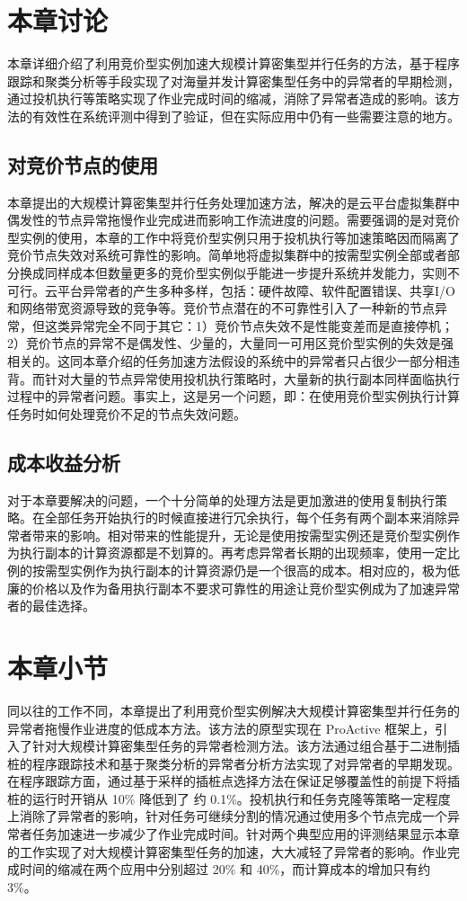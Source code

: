 \section{本章讨论}
本章详细介绍了利用竞价型实例加速大规模计算密集型并行任务的方法，基于程序跟踪和聚类分析等手段实现了对海量并发计算密集型任务中的异常者的早期检测，通过投机执行等策略实现了作业完成时间的缩减，消除了异常者造成的影响。该方法的有效性在系统评测中得到了验证，但在实际应用中仍有一些需要注意的地方。

\subsection{对竞价节点的使用}
本章提出的大规模计算密集型并行任务处理加速方法，解决的是云平台虚拟集群中偶发性的节点异常拖慢作业完成进而影响工作流进度的问题。需要强调的是对竞价型实例的使用，本章的工作中将竞价型实例只用于投机执行等加速策略因而隔离了竞价节点失效对系统可靠性的影响。简单地将虚拟集群中的按需型实例全部或者部分换成同样成本但数量更多的竞价型实例似乎能进一步提升系统并发能力，实则不可行。云平台异常者的产生多种多样，包括：硬件故障、软件配置错误、共享I/O和网络带宽资源导致的竞争等。竞价节点潜在的不可靠性引入了一种新的节点异常，但这类异常完全不同于其它：1）竞价节点失效不是性能变差而是直接停机；2）竞价节点的异常不是偶发性、少量的，大量同一可用区竞价型实例的失效是强相关的。这同本章介绍的任务加速方法假设的系统中的异常者只占很少一部分相违背。而针对大量的节点异常使用投机执行策略时，大量新的执行副本同样面临执行过程中的异常者问题。事实上，这是另一个问题，即：在使用竞价型实例执行计算任务时如何处理竞价不足的节点失效问题。

\subsection{成本收益分析}
对于本章要解决的问题，一个十分简单的处理方法是更加激进的使用复制执行策略。在全部任务开始执行的时候直接进行冗余执行，每个任务有两个副本来消除异常者带来的影响。相对带来的性能提升，无论是使用按需型实例还是竞价型实例作为执行副本的计算资源都是不划算的。再考虑异常者长期的出现频率，使用一定比例的按需型实例作为执行副本的计算资源仍是一个很高的成本。相对应的，极为低廉的价格以及作为备用执行副本不要求可靠性的用途让竞价型实例成为了加速异常者的最佳选择。

\section{本章小节}
同以往的工作不同，本章提出了利用竞价型实例解决大规模计算密集型并行任务的异常者拖慢作业进度的低成本方法。该方法的原型实现在 ProActive 框架上，引入了针对大规模计算密集型任务的异常者检测方法。该方法通过组合基于二进制插桩的程序跟踪技术和基于聚类分析的异常者分析方法实现了对异常者的早期发现。在程序跟踪方面，通过基于采样的插桩点选择方法在保证足够覆盖性的前提下将插桩的运行时开销从 10\% 降低到了 约 0.1\%。投机执行和任务克隆等策略一定程度上消除了异常者的影响，针对任务可继续分割的情况通过使用多个节点完成一个异常者任务加速进一步减少了作业完成时间。针对两个典型应用的评测结果显示本章的工作实现了对大规模计算密集型任务的加速，大大减轻了异常者的影响。作业完成时间的缩减在两个应用中分别超过 20\% 和 40\%，而计算成本的增加只有约 3\%。
